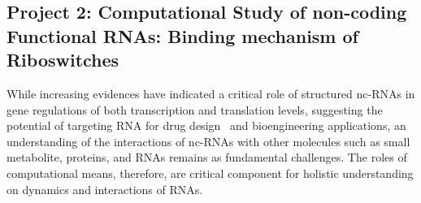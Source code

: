 \documentclass[a4paper,10pt]{article}
\newcommand{\dctfnsp}{dC$_{25}$}
\newcommand{\atfnsp}{A$_{25}$}
\newcommand{\dconsp}{dC$_{1}$}
\newcommand{\aonsp}{A$_{1}$}
\newcommand{\ahl}{$\alpha$HL }
\begin{document}

\subsection*{Project 2: Computational Study of non-coding Functional RNAs: Binding mechanism of Riboswitches}


While increasing evidences have indicated a critical role of structured nc-RNAs in gene regulations of both transcription and translation levels, suggesting the potential of targeting RNA for drug
design~\cite{foloppe} and bioengineering applications, an understanding of the interactions of nc-RNAs with other molecules such as small metabolite, proteins, and RNAs remains as fundamental challenges.  The roles of computational means, therefore, are critical component for holistic understanding on dynamics and interactions of RNAs.  
\end{document}
